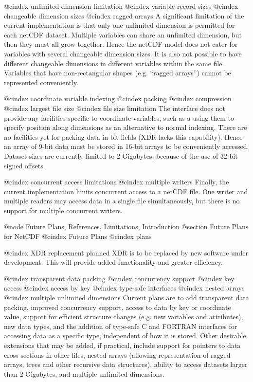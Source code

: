 @cindex unlimited dimension limitation
@cindex variable record sizes
@cindex changeable dimension sizes
@cindex ragged arrays
A significant limitation of the current implementation is that only one
unlimited dimension is permitted for each netCDF dataset.  Multiple
variables can share an unlimited dimension, but then they must all grow
together.  Hence the netCDF model does not cater for
variables with several changeable dimension sizes.
It is also not possible to have different changeable dimensions in
different variables within the same file.
Variables that have non-rectangular shapes (e.g. ``ragged arrays'')
cannot be represented conveniently.

@cindex coordinate variable indexing
@cindex packing
@cindex compression
@cindex largest file size
@cindex file size limitation
The interface does not provide any facilities specific to coordinate
variables, such as a using them to specify position along dimensions as an
alternative to normal indexing.
There are no facilities yet for packing
data in bit fields (XDR lacks this capability).  Hence an array of 9-bit
data must be stored in 16-bit arrays to be conveniently accessed.
Dataset sizes are
currently limited to 2 Gigabytes, because of the use of 32-bit signed
offsets.

@cindex concurrent access limitations
@cindex multiple writers
Finally, the current implementation limits concurrent access to a netCDF
file.  One writer and multiple readers may access data in a single file
simultaneously, but there is no support for multiple concurrent writers.

@node Future Plans, References, Limitations, Introduction
@section Future Plans for NetCDF
@cindex Future Plans
@cindex plans

@cindex XDR replacement planned
XDR is to be replaced by new software under development.
This will provide added functionality and greater efficiency.

@cindex transparent data packing
@cindex concurrency support
@cindex key access
@cindex access by key
@cindex type-safe interfaces
@cindex nested arrays
@cindex multiple unlimited dimensions
Current plans are to add transparent data packing,
improved concurrency support,
access to data by key or coordinate value,
support for efficient structure changes (e.g. new variables and attributes),
new data types,
and the addition of type-safe C and FORTRAN interfaces for accessing data as
a specific type, independent of how it is stored.
Other desirable
extensions that may be added, if practical, include support for pointers
to data cross-sections in other files, nested arrays (allowing representation
of ragged arrays, trees and other recursive data structures), ability
to access datasets larger than 2 Gigabytes, and multiple unlimited dimensions.

